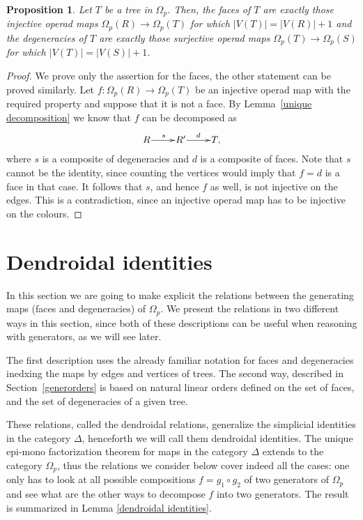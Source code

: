 \documentclass[a4paper]{amsart}
\theoremstyle{plain}
\newtheorem{prop}[thm]{Proposition}
\theoremstyle{definition}
\theoremstyle{remark}
\newcommand{\rpd}{\Omega_p}
\newcommand{\To}{\longrightarrow}
\numberwithin{equation}{section}
\numberwithin{figure}{section}
\begin{document}
\begin{prop}\label{prop:allmonic}
    Let $T$ be a tree in $\rpd$. Then, the faces of $T$ are exactly those injective operad maps $\Omega_p(R)\To\Omega_p(T)$
    for which $|V(T)|=|V(R)|+1$ and the degeneracies of $T$ are exactly those surjective operad maps $\Omega_p(T)\To \Omega_p(S)$ for which
    $|V(T)|=|V(S)|+1$.
\end{prop}
\begin{proof} We prove only the assertion for the faces, the other statement can be proved similarly.
    Let $f\colon \Omega_p(R)\To \Omega_p(T)$ be an injective operad map with the required property and suppose that it is not a face.
    By Lemma~\ref{unique decomposition} we know that $f$ can be decomposed as
    \[
        \xymatrix@1{R\ar[r]^s &R'\ar[r]^d &T,}
    \]
    where $s$ is a composite of degeneracies and $d$ is a composite of faces. Note that $s$ cannot be the identity, since counting the vertices would imply that $f=d$ is a face in that case. It follows that $s$, and hence $f$ as well, is not injective on the edges. This is a contradiction, since an injective operad map has to be injective on the colours.
\end{proof}

\section{Dendroidal identities}\label{subsec:Dendroidal_identities}
In this section we are going to make explicit the relations between the generating maps (faces and degeneracies) of $\rpd$.
We present the relations in two different ways in this section, since both of these descriptions can be useful when reasoning with generators, as we will see later.

The first description uses the already familiar notation for faces
and degeneracies inedxing the maps by edges and vertices of
trees. The second way, described in Section~\ref{generorders} is based on natural linear orders defined on
the set of faces, and the set of degeneracies of a given tree.

These relations, called the dendroidal relations, generalize the simplicial identities in the category $\Delta$,
henceforth we will call them dendroidal identities. The unique epi-mono factorization theorem for maps in the category
$\Delta$ extends to the category $\rpd$, thus the relations we consider below cover indeed all the cases: one only has to look at all possible
compositions $f=g_1\circ g_2$ of two generators of $\rpd$ and see what are the other ways to decompose $f$ into two
generators. The result is summarized in Lemma \ref{dendroidal identities}.
\end{document}
